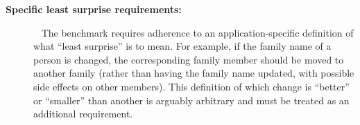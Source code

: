 \begin{description}
	\item[\textbf{Specific least surprise requirements:}]~
	The bench\-mark requires adherence to an application-specific definition of what ``least surprise'' is to mean.
	For example, if the family name of a person is changed, the corresponding family member should be moved to another family (rather than having the family name updated, with possible side effects on other members).
	This definition of which change is ``better'' or ``smaller'' than another is arguably arbitrary and must be treated as an additional requirement.
\end{description}
